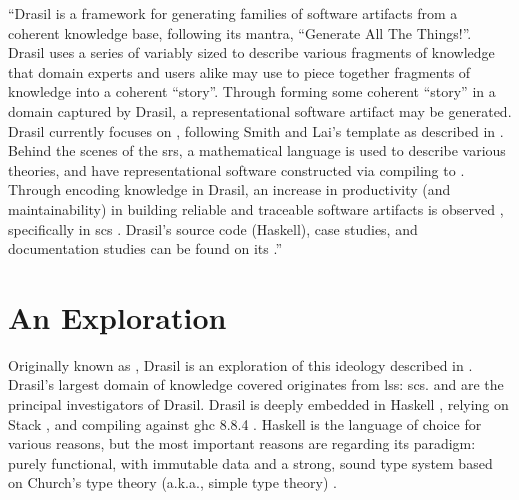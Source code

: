 
\begin{mdleftbar}
      ``Drasil is a framework for generating families of software artifacts from
      a coherent knowledge base, following its mantra, ``Generate All The
      Things!''. Drasil uses a series of variably sized  to describe
      various fragments of knowledge that domain experts and users alike may use
      to piece together fragments of knowledge into a coherent ``story''.
      Through forming some coherent ``story'' in a domain captured by Drasil, a
      representational software artifact may be generated. Drasil currently
      focuses on , following Smith and Lai's  template as
      described in \cite{SmithAndLai2005}. Behind the scenes of the \acs{srs}, a
      mathematical language is used to describe various theories, and have
      representational software constructed via compiling to 
      \cite{Carette2019}. Through encoding knowledge in Drasil, an increase in
      productivity (and maintainability) in building reliable and traceable
      software artifacts is observed \cite{SzymczakEtAl2016}, specifically in
      \acs{scs} \cite{Smith2018}. Drasil's source code (Haskell), case studies,
      and documentation studies can be found on its
      .''
      \cite{Balaci2021Poster}
\end{mdleftbar}

\section{An Exploration}

Originally known as  , Drasil is an exploration of this
ideology described in . Drasil's largest domain of knowledge
covered originates from \acs{lss}: \acl{scs}.  and  are the principal investigators of
Drasil. Drasil is deeply embedded in Haskell \cite{Haskell2010}, relying on
Stack , and compiling against \acs{ghc} 8.8.4 \cite{GHC884}. Haskell
is the language of choice for various reasons, but the most important reasons
are regarding its paradigm: purely functional, with immutable data and a strong,
sound type system based on Church's type theory (a.k.a., simple type theory)
.

